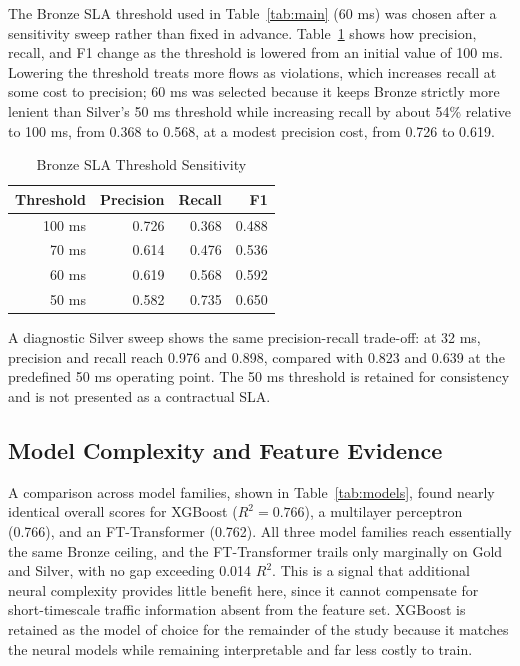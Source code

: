 \documentclass[conference]{IEEEtran}
\begin{document}
The Bronze SLA threshold used in Table~\ref{tab:main} (60 ms) was chosen after a sensitivity sweep rather than fixed in advance. Table~\ref{tab:bronze_sweep} shows how precision, recall, and F1 change as the threshold is lowered from an initial value of 100 ms. Lowering the threshold treats more flows as violations, which increases recall at some cost to precision; 60 ms was selected because it keeps Bronze strictly more lenient than Silver's 50 ms threshold while increasing recall by about 54\% relative to 100 ms, from 0.368 to 0.568, at a modest precision cost, from 0.726 to 0.619.

\begin{table}[t]
\caption{Bronze SLA Threshold Sensitivity}
\label{tab:bronze_sweep}
\centering
\setlength{\tabcolsep}{6pt}
\begin{tabular}{rrrr}
\toprule
Threshold & Precision & Recall & F1 \\
\midrule
100 ms & 0.726 & 0.368 & 0.488 \\
70 ms  & 0.614 & 0.476 & 0.536 \\
60 ms  & 0.619 & 0.568 & 0.592 \\
50 ms  & 0.582 & 0.735 & 0.650 \\
\bottomrule
\end{tabular}
\end{table}

A diagnostic Silver sweep shows the same precision-recall trade-off: at 32 ms, precision and recall reach 0.976 and 0.898, compared with 0.823 and 0.639 at the predefined 50 ms operating point. The 50 ms threshold is retained for consistency and is not presented as a contractual SLA.

\subsection{Model Complexity and Feature Evidence}

A comparison across model families, shown in Table~\ref{tab:models}, found nearly identical overall scores for XGBoost ($R^2=0.766$), a multilayer perceptron (0.766), and an FT-Transformer (0.762). All three model families reach essentially the same Bronze ceiling, and the FT-Transformer trails only marginally on Gold and Silver, with no gap exceeding 0.014 $R^2$. This is a signal that additional neural complexity provides little benefit here, since it cannot compensate for short-timescale traffic information absent from the feature set. XGBoost is retained as the model of choice for the remainder of the study because it matches the neural models while remaining interpretable and far less costly to train.
\end{document}
